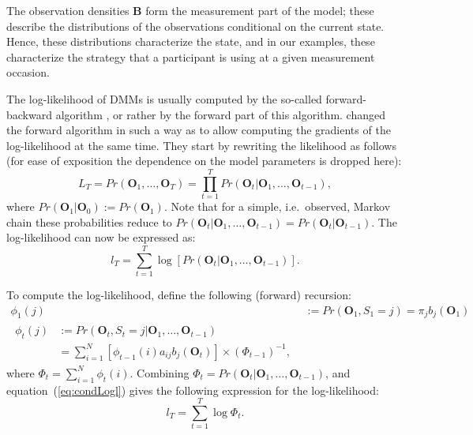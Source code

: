 \documentclass[a4paper,12pt,man]{apa} %
\newcommand{\citep}{\cite}
\newcommand{\mat}{\mathbf}
\newcommand{\vc}{\mathbf}
\begin{document}
The observation densities $\mat{B}$ form the measurement part of the
model; these describe the distributions of the observations
conditional on the current state. Hence, these distributions
characterize the state, and in our examples, these characterize the
strategy that a participant is using at a given measurement occasion.

The log-likelihood of DMMs is usually computed by the
so-called forward-backward algorithm \citep{Baum1966,Rabiner1989}, or
rather by the forward part of this algorithm.  \cite{Lystig2002}
changed the forward algorithm in such a way as to allow computing the
gradients of the log-likelihood at the same time.  They start by
rewriting the likelihood as follows (for ease of exposition the
dependence on the model parameters is dropped here):
\begin{equation}
	L_{T} = Pr(\vc{O}_{1}, \ldots, \vc{O}_{T}) = \prod_{t=1}^{T}
Pr(\vc{O}_{t}|\vc{O}_{1},
	\ldots, \vc{O}_{t-1}),
	\label{condLike}
\end{equation}
where $Pr(\vc{O}_{1}|\vc{O}_{0}):=Pr(\vc{O}_{1})$. Note that for a
simple, i.e.\ observed, Markov chain these probabilities reduce to
$Pr(\vc{O}_{t}|\vc{O}_{1},\ldots,
\vc{O}_{t-1})=Pr(\vc{O}_{t}|\vc{O}_{t-1})$.
The log-likelihood can now be expressed as:
\begin{equation}
	l_{T} = \sum_{t=1}^{T} \log[Pr(\vc{O}_{t}|\vc{O}_{1}, \ldots,
\vc{O}_{t-1})].
	\label{eq:condLogl}
\end{equation}

To compute the log-likelihood, \cite{Lystig2002} define the following
(forward) recursion:
\begin{align}
	\phi_{1}(j) &:= Pr(\vc{O}_{1}, S_{1}=j) = \pi_{j} b_{j}(\vc{O}_{1})
	\label{eq:fwd1} \\
\begin{split}
	\phi_{t}(j) &:= Pr(\vc{O}_{t}, S_{t}=j|\vc{O}_{1}, \ldots,
\vc{O}_{t-1}) \\
	&= \sum_{i=1}^{N} [\phi_{t-1}(i)a_{ij}b_{j}(\vc{O}_{t})] \times
(\Phi_{t-1})^{-1},
	\label{eq:fwdt}
\end{split}
\end{align}
where $\Phi_{t}=\sum_{i=1}^{N} \phi_{t}(i)$. Combining
$\Phi_{t}=Pr(\vc{O}_{t}|\vc{O}_{1}, \ldots, \vc{O}_{t-1})$, and
equation~(\ref{eq:condLogl}) gives the following expression for the
log-likelihood:
\begin{equation}
	l_{T} = \sum_{t=1}^{T} \log \Phi_{t}.
	\label{eq:logl}
\end{equation}
\end{document}

